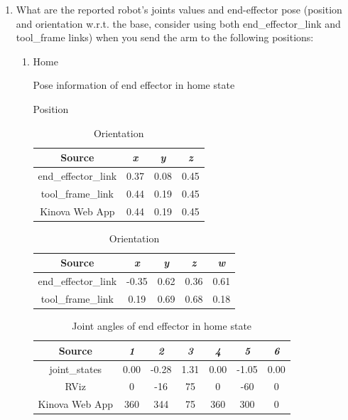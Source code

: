 \documentclass[12pt]{article}
\begin{document}
\begin{enumerate}

    \item What are the reported robot’s joints values and end-effector pose (position and orientation w.r.t. the base, consider using both end\_effector\_link and tool\_frame links) when you send the arm to the following positions:
    
    \begin{enumerate}

        \item Home
        
        \begin{table}[H]
            \caption{Pose information of end effector in home state}
            \begin{subtable}{.4\linewidth}
                \centering
                \caption{Position}
                \begin{tabular}{cccc}
                    \toprule
                    Source & \textit{x} & \textit{y} & \textit{z} \\\midrule
                    end\_effector\_link & 0.37 & 0.08 & 0.45 \\
                    tool\_frame\_link & 0.44 & 0.19 & 0.45 \\
                    Kinova Web App & 0.44 & 0.19 & 0.45 \\\bottomrule
                \end{tabular}
            \end{subtable}
            \hfill
            \begin{subtable}{.52\linewidth}
                \centering
                \caption{Orientation}
                \begin{tabular}{ccccc}
                    \toprule
                    Source & \textit{x} & \textit{y} & \textit{z} & \textit{w} \\\midrule
                    end\_effector\_link & -0.35 & 0.62 & 0.36 & 0.61 \\
                    tool\_frame\_link & 0.19 & 0.69 & 0.68 & 0.18 \\\bottomrule
                \end{tabular}
            \end{subtable}
        \end{table}
        \vspace{-10pt}
        \begin{table}[H]
            \centering
            \caption{Joint angles of end effector in home state}
            \begin{tabular}{ccccccc}
            \toprule
            Source & \textit{1} & \textit{2} & \textit{3} & \textit{4} & \textit{5} & \textit{6} \\\midrule
            joint\_states & 0.00 & -0.28 & 1.31 & 0.00 & -1.05 & 0.00 \\
            RViz & 0 & -16 & 75 & 0 & -60 & 0 \\
            Kinova Web App & 360 & 344 & 75 & 360 & 300 & 0 \\\bottomrule
            \end{tabular}
        \end{table}


\end{enumerate}
\end{enumerate}
\end{document}
